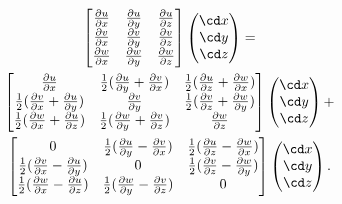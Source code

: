 \documentclass[twoside,11pt]		{report}
\begin{document}
\begin{multline}
\begin{bmatrix}
 \frac{\partial u}{\partial x}&
 \frac{\partial u}{\partial y}&
 \frac{\partial u}{\partial z}\\
 \frac{\partial v}{\partial x}&
 \frac{\partial v}{\partial y}&
 \frac{\partial v}{\partial z}\\
 \frac{\partial w}{\partial x}&
 \frac{\partial w}{\partial y}&
 \frac{\partial w}{\partial z}\\
\end{bmatrix}
\begin{pmatrix}
\cd x \\ \cd y \\ \cd z
\end{pmatrix}
=\\
\begin{bmatrix}
 \frac{\partial u}{\partial x}&
 \frac{1}{2}(\frac{\partial u}{\partial y}+\frac{\partial v}{\partial x})&
 \frac{1}{2}(\frac{\partial u}{\partial z}+\frac{\partial w}{\partial x})\\
 \frac{1}{2}(\frac{\partial v}{\partial x}+\frac{\partial u}{\partial y})&
 \frac{\partial v}{\partial y}&
 \frac{1}{2}(\frac{\partial v}{\partial z}+\frac{\partial w}{\partial y})\\
 \frac{1}{2}(\frac{\partial w}{\partial x}+\frac{\partial u}{\partial z})&
 \frac{1}{2}(\frac{\partial w}{\partial y}+\frac{\partial v}{\partial z})&
 \frac{\partial w}{\partial z}\\
\end{bmatrix}
\begin{pmatrix}
\cd x \\ \cd y \\ \cd z
\end{pmatrix}
+\\
\begin{bmatrix}
 0 &
 \frac{1}{2}(\frac{\partial u}{\partial y}-\frac{\partial v}{\partial x})&
 \frac{1}{2}(\frac{\partial u}{\partial z}-\frac{\partial w}{\partial x})\\
 \frac{1}{2}(\frac{\partial v}{\partial x}-\frac{\partial u}{\partial y})&
 0 &
 \frac{1}{2}(\frac{\partial v}{\partial z}-\frac{\partial w}{\partial y})\\
 \frac{1}{2}(\frac{\partial w}{\partial x}-\frac{\partial u}{\partial z})&
 \frac{1}{2}(\frac{\partial w}{\partial y}-\frac{\partial v}{\partial z})&
 0\\
\end{bmatrix}
\begin{pmatrix}
\cd x \\ \cd y \\ \cd z
\end{pmatrix}.
\label{eq.decomp}
\end{multline}
\end{document}
